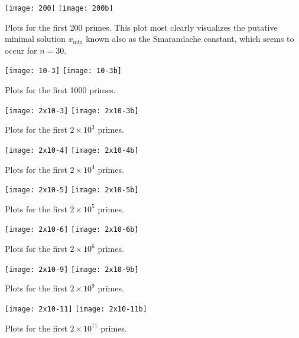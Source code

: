 \documentclass[12pt]{article}
\begin{document}
\texttt{[image: 200]} \texttt{[image: 200b]}

Plots for the first 200 primes. This plot most clearly visualizes the putative minimal solution $x_{\min}$ known also as the Smarandache constant, which seems to occur for $n=30$.

\texttt{[image: 10-3]} \texttt{[image: 10-3b]}

Plots for the first 1000 primes.

\texttt{[image: 2x10-3]} \texttt{[image: 2x10-3b]}

Plots for the first $2 \times 10^3$ primes.

\texttt{[image: 2x10-4]} \texttt{[image: 2x10-4b]}

Plots for the first $2 \times 10^4$ primes.

\texttt{[image: 2x10-5]} \texttt{[image: 2x10-5b]}

Plots for the first $2 \times 10^5$ primes.

\texttt{[image: 2x10-6]} \texttt{[image: 2x10-6b]}

Plots for the first $2 \times 10^6$ primes.

\texttt{[image: 2x10-9]} \texttt{[image: 2x10-9b]}

Plots for the first $2 \times 10^9$ primes.

\texttt{[image: 2x10-11]} \texttt{[image: 2x10-11b]}

Plots for the first $2 \times 10^{11}$ primes.


\end{document}
